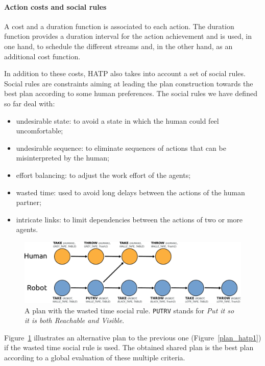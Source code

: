 \documentclass[preprint,3p,times]{elsarticle}
\begin{document}
\paragraph{Action costs and social rules}

A cost and a duration function is associated to each action.  The duration
function provides a duration interval for the action achievement and is used, in
one hand, to schedule the different streams and, in the other hand, as an
additional cost function.

In addition to these costs, HATP also takes into
account a set of social rules.  Social rules are constraints aiming at leading
the plan construction towards the best plan according to some human preferences.
The social rules we have defined so far deal with:

\begin{itemize}
\item undesirable state: to avoid a state in which the human could
  feel uncomfortable;
\item undesirable sequence: to eliminate sequences of actions that can
  be misinterpreted by the human;
\item effort balancing: to adjust the work effort of the agents;
\item wasted time: used to avoid long delays between the actions of
  the human partner;
\item intricate links: to limit dependencies between the actions of
  two or more agents.
\end{itemize}

\begin{figure}[htbp]
  \centering
  \includegraphics[width=0.95\columnwidth]{second_plan.pdf}
  \caption{A plan with the wasted time social rule. {\tt PUTRV} stands for {\it Put it so it is both Reachable and Visible}.}
  \label{plan_hatp2}
\end{figure}

Figure~\ref{plan_hatp2} illustrates an alternative plan to the previous 
one (Figure~\ref{plan_hatp1}) if the wasted time social rule is used.
The obtained shared plan is the best plan according to a global evaluation of
these multiple criteria.
\end{document}
